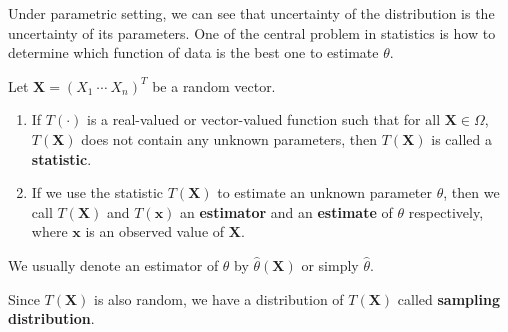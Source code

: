 \documentclass{huhtakm-template-book-v2}
\begin{document}
\newpage
Under parametric setting, we can see that uncertainty of the distribution is the uncertainty of its parameters. One of the central problem in statistics is how to determine which function of data is the best one to estimate $\theta$.
\begin{defn}
	Let $\mathbf{X}=(X_{1}\ \cdots\ X_{n})^{T}$ be a random vector.
	\begin{enumerate}
		\item If $T(\cdot)$ is a real-valued or vector-valued function such that for all $\mathbf{X}\in\Omega$, $T(\mathbf{X})$ does not contain any unknown parameters, then $T(\mathbf{X})$ is called a \textbf{statistic}.
		\item If we use the statistic $T(\mathbf{X})$ to estimate an unknown parameter $\theta$, then we call $T(\mathbf{X})$ and $T(\mathbf{x})$ an \textbf{estimator} and an \textbf{estimate} of $\theta$ respectively, where $\mathbf{x}$ is an observed value of $\mathbf{X}$.
	\end{enumerate}
\end{defn}
\begin{rem}
	We usually denote an estimator of $\theta$ by $\hat{\theta}(\mathbf{X})$ or simply $\hat{\theta}$.
\end{rem}
\begin{rem}
	Since $T(\mathbf{X})$ is also random, we have a distribution of $T(\mathbf{X})$ called \textbf{sampling distribution}.
\end{rem}
\end{document}
